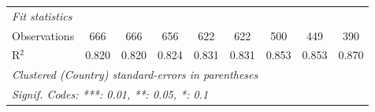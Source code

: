 \begin{tabular}{lcccccccc}
   \midrule \emph{Fit statistics}\\
   Observations                                                      & 666         & 666          & 656         & 622           & 622           & 500           & 449          & 390\\  
   R$^2$                                                             & 0.820       & 0.820        & 0.824       & 0.831         & 0.831         & 0.853         & 0.853        & 0.870\\  
   \midrule
   \multicolumn{9}{l}{\emph{Clustered (Country) standard-errors in parentheses}}\\
   \multicolumn{9}{l}{\emph{Signif. Codes: ***: 0.01, **: 0.05, *: 0.1}}\\
\end{tabular}
\par\endgroup



